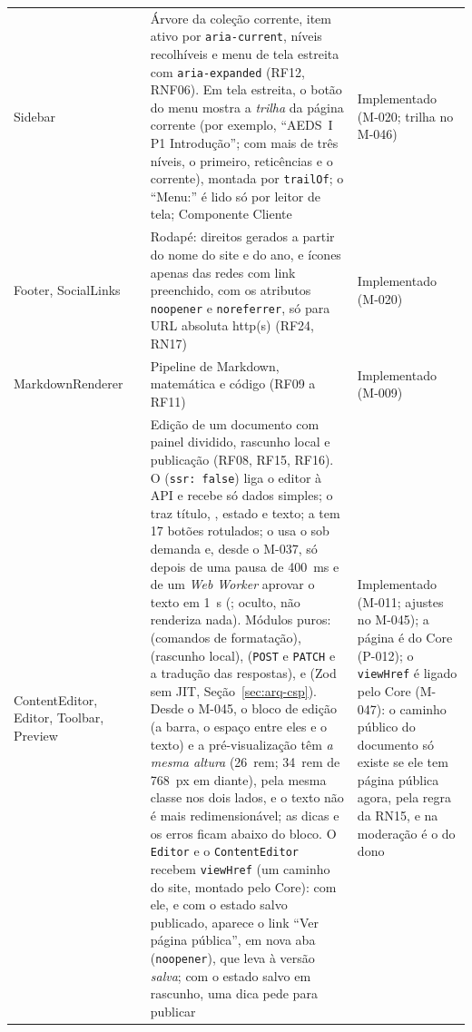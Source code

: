 \begin{longtable}{@{}L{3.3cm}L{2.9cm}L{6.0cm}L{2.2cm}@{}}
Sidebar &  & Árvore da coleção corrente, item ativo por \texttt{aria-current}, níveis recolhíveis e menu de tela estreita com \texttt{aria-expanded} (RF12, RNF06). Em tela estreita, o botão do menu mostra a \emph{trilha} da página corrente (por exemplo, ``AEDS~I \guilsinglright{} P1 \guilsinglright{} Introdução''; com mais de três níveis, o primeiro, reticências e o corrente), montada por \texttt{trailOf}; o ``Menu:'' é lido só por leitor de tela; Componente Cliente & Implementado (M-020; trilha no M-046)\\
Footer, SocialLinks &  & Rodapé: direitos gerados a partir do nome do site e do ano, e ícones apenas das redes com link preenchido, com os atributos \texttt{noopener} e \texttt{noreferrer}, só para URL absoluta http(s) (RF24, RN17) & Implementado (M-020)\\
MarkdownRenderer &  & Pipeline de Markdown, matemática e código (RF09 a RF11) & Implementado (M-009)\\
ContentEditor, Editor, Toolbar, Preview &  & Edição de um documento com painel dividido, rascunho local e publicação (RF08, RF15, RF16). O  (\texttt{ssr: false}) liga o editor à API e recebe só dados simples; o  traz título, , estado e texto; a  tem 17 botões rotulados; o  usa o  sob demanda e, desde o M-037, só depois de uma pausa de 400~ms e de um \emph{Web Worker} aprovar o texto em 1~s (; oculto, não renderiza nada). Módulos puros:  (comandos de formatação),  (rascunho local),  (\texttt{POST} e \texttt{PATCH} e a tradução das respostas),  e  (Zod sem JIT, Seção~\ref{sec:arq-csp}). Desde o M-045, o bloco de edição (a barra, o espaço entre eles e o texto) e a pré-visualização têm \emph{a mesma altura} (26~rem; 34~rem de 768~px em diante), pela mesma classe nos dois lados, e o texto não é mais redimensionável; as dicas e os erros ficam abaixo do bloco. O \texttt{Editor} e o \texttt{ContentEditor} recebem \texttt{viewHref} (um caminho do site, montado pelo Core): com ele, e com o estado salvo publicado, aparece o link ``Ver página pública'', em nova aba (\texttt{noopener}), que leva à versão \emph{salva}; com o estado salvo em rascunho, uma dica pede para publicar & Implementado (M-011; ajustes no M-045); a página é do Core (P-012); o \texttt{viewHref} é ligado pelo Core (M-047): o caminho público do documento só existe se ele tem página pública agora, pela regra da RN15, e na moderação é o do dono\\

\end{longtable}
